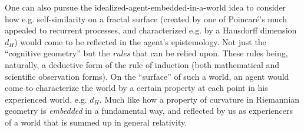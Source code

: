 \documentclass{article}
\begin{document}
One can also pursue the idealized-agent-embedded-in-a-world idea to consider how e.g. self-similarity on a fractal surface (created by one of Poincar\'e's much appealed to recurrent processes, and characterized e.g. by a Hausdorff dimension $d_H$) would come to be reflected in the agent's epistemology.  Not just the ``cognitive geometry'' but the \emph{rules} that can be relied upon.  These rules being, naturally, a deductive form of the rule of induction (both mathematical and scientific observation forms).  On the ``surface'' of such a world, an agent would come to characterize the world by a certain property at each point in his experienced world, e.g. $d_H$.  Much like how a property of curvature in Riemannian geometry is \emph{embedded} in a fundamental way, and reflected by us as experiencers of a world that is summed up in general relativity.
\end{document}
